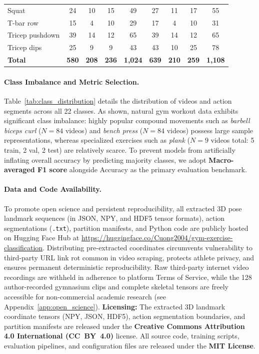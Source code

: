 \documentclass[runningheads]{llncs}
\begin{document}
\begin{table}[!t]
{\begin{tabular}{l cccc cccc}
Squat                   & 24 & 10 & 15 & 49  & 27 & 11 & 17 & 55 \\
T-bar row               & 15 &  4 & 10 & 29  & 17 &  4 & 10 & 31 \\
Tricep pushdown         & 39 & 14 & 12 & 65  & 39 & 14 & 12 & 65 \\
Tricep dips             & 25 &  9 &  9 & 43  & 43 & 10 & 25 & 78 \\
\midrule
\textbf{Total}          & \textbf{580} & \textbf{208} & \textbf{236} & \textbf{1,024} & \textbf{639} & \textbf{210} & \textbf{259} & \textbf{1,108} \\
\bottomrule
\end{tabular}
}
\end{table}

\paragraph{Class Imbalance and Metric Selection.} Table~\ref{tab:class_distribution} details the distribution of videos and action segments across all 22 classes. As shown, natural gym workout data exhibits significant class imbalance: highly popular compound movements such as \textit{barbell biceps curl} ($N=84$ videos) and \textit{bench press} ($N=84$ videos) possess large sample representations, whereas specialized exercises such as \textit{plank} ($N=9$ videos total: 5 train, 2 val, 2 test) are relatively scarce. To prevent models from artificially inflating overall accuracy by predicting majority classes, we adopt \textbf{Macro-averaged F1 score} alongside Accuracy as the primary evaluation benchmark.

\paragraph{Data and Code Availability.} To promote open science and persistent reproducibility, all extracted 3D pose landmark sequences (in JSON, NPY, and HDF5 tensor formats), action segmentations (\texttt{.txt}), partition manifests, and Python code are publicly hosted on Hugging Face Hub at \url{https://huggingface.co/Cuong2004/gym-exercise-classification}. Distributing pre-extracted coordinates circumvents vulnerability to third-party URL link rot common in video scraping, protects athlete privacy, and ensures permanent deterministic reproducibility. Raw third-party internet video recordings are withheld in adherence to platform Terms of Service, while the 128 author-recorded gymnasium clips and complete skeletal tensors are freely accessible for non-commercial academic research (see Appendix~\ref{app:open_science}). \textbf{Licensing:} The extracted 3D landmark coordinate tensors (NPY, JSON, HDF5), action segmentation boundaries, and partition manifests are released under the \textbf{Creative Commons Attribution 4.0 International (CC~BY~4.0)} license. All source code, training scripts, evaluation pipelines, and configuration files are released under the \textbf{MIT License}.
\end{document}

